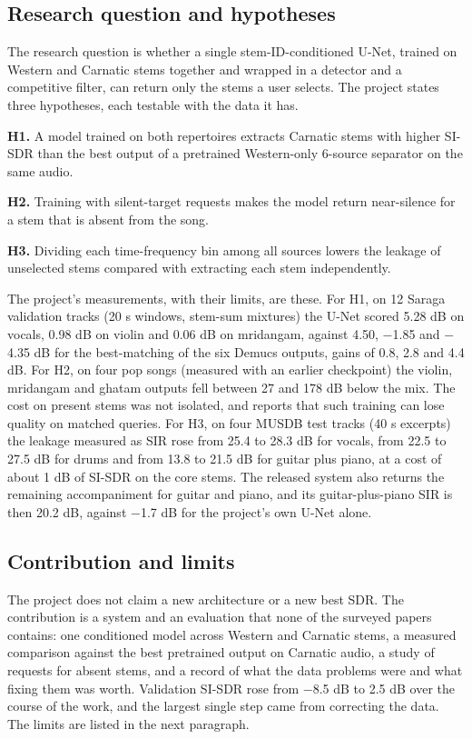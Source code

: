 \documentclass[12pt,a4paper]{article}
\begin{document}
\subsection{Research question and hypotheses}

The research question is whether a single stem-ID-conditioned U-Net, trained on Western and Carnatic stems together and wrapped in a detector and a competitive filter, can return only the stems a user selects. The project states three hypotheses, each testable with the data it has.

\textbf{H1.} A model trained on both repertoires extracts Carnatic stems with higher SI-SDR than the best output of a pretrained Western-only 6-source separator on the same audio.

\textbf{H2.} Training with silent-target requests makes the model return near-silence for a stem that is absent from the song.

\textbf{H3.} Dividing each time-frequency bin among all sources lowers the leakage of unselected stems compared with extracting each stem independently.

The project's measurements, with their limits, are these. For H1, on 12 Saraga validation tracks (20 s windows, stem-sum mixtures) the U-Net scored 5.28 dB on vocals, 0.98 dB on violin and 0.06 dB on mridangam, against 4.50, $-$1.85 and $-$4.35 dB for the best-matching of the six Demucs outputs, gains of 0.8, 2.8 and 4.4 dB. For H2, on four pop songs (measured with an earlier checkpoint) the violin, mridangam and ghatam outputs fell between 27 and 178 dB below the mix. The cost on present stems was not isolated, and \cite{pmq} reports that such training can lose quality on matched queries. For H3, on four MUSDB test tracks (40 s excerpts) the leakage measured as SIR rose from 25.4 to 28.3 dB for vocals, from 22.5 to 27.5 dB for drums and from 13.8 to 21.5 dB for guitar plus piano, at a cost of about 1 dB of SI-SDR on the core stems. The released system also returns the remaining accompaniment for guitar and piano, and its guitar-plus-piano SIR is then 20.2 dB, against $-$1.7 dB for the project's own U-Net alone.

\subsection{Contribution and limits}

The project does not claim a new architecture or a new best SDR. The contribution is a system and an evaluation that none of the surveyed papers contains: one conditioned model across Western and Carnatic stems, a measured comparison against the best pretrained output on Carnatic audio, a study of requests for absent stems, and a record of what the data problems were and what fixing them was worth. Validation SI-SDR rose from $-$8.5 dB to 2.5 dB over the course of the work, and the largest single step came from correcting the data. The limits are listed in the next paragraph.
\end{document}
